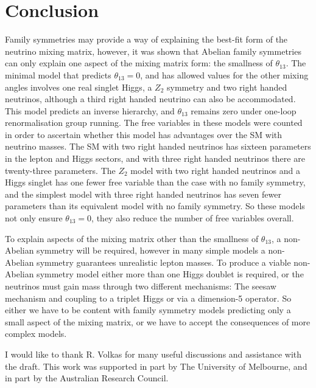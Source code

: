 \documentclass[nofootinbib,showpacs]{revtex4}
\begin{document}
\section{Conclusion}

Family symmetries may provide a way of explaining the best-fit form of the neutrino mixing matrix, however, it was shown that Abelian family symmetries can only explain one aspect of the mixing matrix form: the smallness of $\theta_{13}$. The minimal model that predicts $\theta_{13}=0$, and has allowed values for the other mixing angles involves one real singlet Higgs, a $Z_2$ symmetry and two right handed neutrinos, although a third right handed neutrino can also be accommodated. This model predicts an inverse hierarchy, and $\theta_{13}$ remains zero under one-loop renormalisation group running. 
The free variables in these models were counted in order to ascertain whether this model has advantages over the SM with neutrino masses. The SM with two right handed neutrinos has sixteen parameters in the lepton and Higgs sectors, and with three right handed neutrinos there are twenty-three parameters. The $Z_2$ model with two right handed neutrinos and a Higgs singlet has one fewer free variable than the case with no family symmetry, and the simplest model with three right handed neutrinos has seven fewer parameters than its equivalent model with no family symmetry. So these models not only ensure $\theta_{13}=0$, they also reduce the number of free variables overall.

To explain aspects of the mixing matrix other than the smallness of $\theta_{13}$, a non-Abelian symmetry will be required, however in many simple models a non-Abelian symmetry guarantees unrealistic lepton masses. To produce a viable non-Abelian symmetry model either more than one Higgs doublet is required, or the neutrinos must gain mass through two different mechanisms: The seesaw mechanism and coupling to a triplet Higgs or via a dimension-5 operator. So either we have to be content with family symmetry models predicting only a small aspect of the mixing matrix, or we have to accept the consequences of more complex models. 

\begin{acknowledgements}
I would like to thank R. Volkas for many useful discussions and assistance with the draft. This work was supported in part by The University of Melbourne, and in part by the 
Australian Research Council.
\end{acknowledgements}

\appendix
\end{document}
